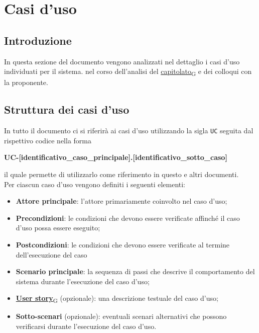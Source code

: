 \section{Casi d'uso}
\subsection{Introduzione}
In questa sezione del documento vengono analizzati nel dettaglio i casi d'uso individuati per il sistema.
nel corso dell'analisi del \href{https://7last.github.io/docs/rtb/documentazione-interna/glossario\#capitolato}{capitolato\textsubscript{G}} e dei colloqui con la proponente.

\subsection{Struttura dei casi d'uso}
In tutto il documento ci si riferirà ai casi d'uso utilizzando la sigla \texttt{UC} seguita dal rispettivo codice nella forma
\begin{center}
	\textbf{UC-[identificativo\_caso\_principale].[identificativo\_sotto\_caso]}
\end{center}

il quale permette di utilizzarlo come riferimento in questo e altri documenti.\\
Per ciascun caso d'uso vengono definiti i seguenti elementi:
\begin{itemize}
	\item \textbf{Attore principale}: l'attore primariamente coinvolto nel caso d'uso;
	\item \textbf{Precondizioni}: le condizioni che devono essere verificate affinché il caso d'uso possa essere
	      eseguito;
	\item \textbf{Postcondizioni}: le condizioni che devono essere verificate al termine dell'esecuzione del caso
	\item \textbf{Scenario principale}: la sequenza di passi che descrive il comportamento del sistema durante
	      l'esecuzione del caso d'uso;
	\item \href{https://7last.github.io/docs/rtb/documentazione-interna/glossario\#user-story}{\textbf{User story}\textsubscript{G}} (opzionale): una descrizione testuale del caso d'uso;
	\item \textbf{Sotto-scenari} (opzionale): eventuali scenari alternativi che possono verificarsi durante l'esecuzione del
	      caso d'uso.
\end{itemize}


